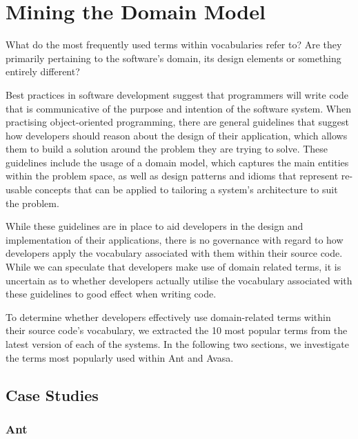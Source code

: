 
\section{Mining the Domain Model} %
\label{sec:mining_the_domain_model}

What do the most frequently used terms within vocabularies refer to? Are they primarily pertaining to the software's domain, its design elements or something entirely different?

Best practices in software development suggest that programmers will write code that is communicative of the purpose and intention of the software system. When practising object-oriented programming, there are general guidelines that suggest how developers should reason about the design of their application, which allows them to build a solution around the problem they are trying to solve. These guidelines include the usage of a domain model, which captures the main entities within the problem space, as well as design patterns and idioms that represent re-usable concepts that can be applied to tailoring a system's architecture to suit the problem.

While these guidelines are in place to aid developers in the design and implementation of their applications, there is no governance with regard to how developers apply the vocabulary associated with them within their source code. While we can speculate that developers make use of domain related terms, it is uncertain as to whether developers actually utilise the vocabulary associated with these guidelines to good effect when writing code.

To determine whether developers effectively use domain-related terms within their source code's vocabulary, we extracted the 10 most popular terms from the latest version of each of the systems. In the following two sections, we investigate the terms most popularly used within Ant and Avasa.

\subsection{Case Studies} %
\label{sub:case_studies}

\subsubsection{Ant} %
\label{ssub:ant}

